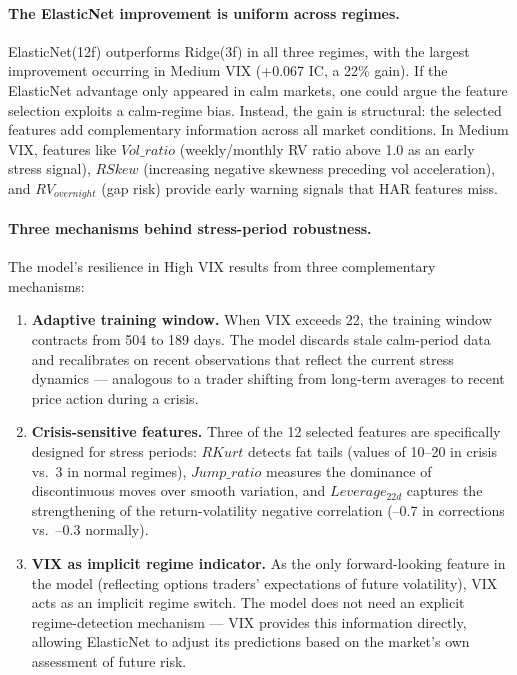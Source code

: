 \documentclass[11pt,a4paper]{article}
\begin{document}
\paragraph{The ElasticNet improvement is uniform across regimes.}
ElasticNet(12f) outperforms Ridge(3f) in all three regimes, with the largest improvement occurring in Medium VIX (+0.067 IC, a 22\% gain). If the ElasticNet advantage only appeared in calm markets, one could argue the feature selection exploits a calm-regime bias. Instead, the gain is structural: the selected features add complementary information across all market conditions. In Medium VIX, features like $Vol\_ratio$ (weekly/monthly RV ratio above 1.0 as an early stress signal), $RSkew$ (increasing negative skewness preceding vol acceleration), and $RV_{overnight}$ (gap risk) provide early warning signals that HAR features miss.

\paragraph{Three mechanisms behind stress-period robustness.}
The model's resilience in High VIX results from three complementary mechanisms:

\begin{enumerate}
    \item \textbf{Adaptive training window.} When VIX exceeds 22, the training window contracts from 504 to 189 days. The model discards stale calm-period data and recalibrates on recent observations that reflect the current stress dynamics --- analogous to a trader shifting from long-term averages to recent price action during a crisis.

    \item \textbf{Crisis-sensitive features.} Three of the 12 selected features are specifically designed for stress periods: $RKurt$ detects fat tails (values of 10--20 in crisis vs.\ 3 in normal regimes), $Jump\_ratio$ measures the dominance of discontinuous moves over smooth variation, and $Leverage_{22d}$ captures the strengthening of the return-volatility negative correlation (--0.7 in corrections vs.\ --0.3 normally).

    \item \textbf{VIX as implicit regime indicator.} As the only forward-looking feature in the model (reflecting options traders' expectations of future volatility), VIX acts as an implicit regime switch. The model does not need an explicit regime-detection mechanism --- VIX provides this information directly, allowing ElasticNet to adjust its predictions based on the market's own assessment of future risk.
\end{enumerate}
\end{document}
